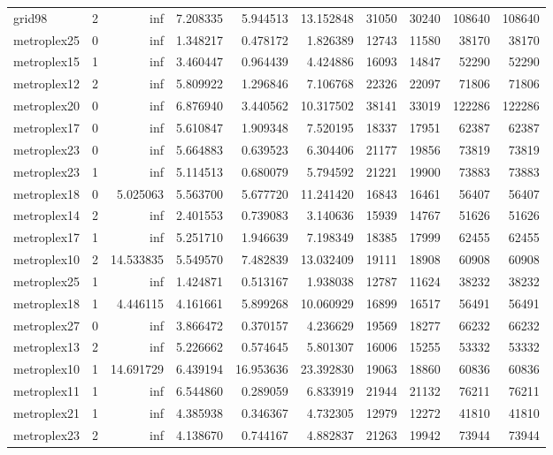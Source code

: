 \begin{longtable}{|l|r|r|r|r|r|r|r|r|r|}
grid98 & 2 & inf & 7.208335 & 5.944513 & 13.152848 & 31050 & 30240 & 108640 & 108640 \\
metroplex25 & 0 & inf & 1.348217 & 0.478172 & 1.826389 & 12743 & 11580 & 38170 & 38170 \\
metroplex15 & 1 & inf & 3.460447 & 0.964439 & 4.424886 & 16093 & 14847 & 52290 & 52290 \\
metroplex12 & 2 & inf & 5.809922 & 1.296846 & 7.106768 & 22326 & 22097 & 71806 & 71806 \\
metroplex20 & 0 & inf & 6.876940 & 3.440562 & 10.317502 & 38141 & 33019 & 122286 & 122286 \\
metroplex17 & 0 & inf & 5.610847 & 1.909348 & 7.520195 & 18337 & 17951 & 62387 & 62387 \\
metroplex23 & 0 & inf & 5.664883 & 0.639523 & 6.304406 & 21177 & 19856 & 73819 & 73819 \\
metroplex23 & 1 & inf & 5.114513 & 0.680079 & 5.794592 & 21221 & 19900 & 73883 & 73883 \\
metroplex18 & 0 & 5.025063 & 5.563700 & 5.677720 & 11.241420 & 16843 & 16461 & 56407 & 56407 \\
metroplex14 & 2 & inf & 2.401553 & 0.739083 & 3.140636 & 15939 & 14767 & 51626 & 51626 \\
metroplex17 & 1 & inf & 5.251710 & 1.946639 & 7.198349 & 18385 & 17999 & 62455 & 62455 \\
metroplex10 & 2 & 14.533835 & 5.549570 & 7.482839 & 13.032409 & 19111 & 18908 & 60908 & 60908 \\
metroplex25 & 1 & inf & 1.424871 & 0.513167 & 1.938038 & 12787 & 11624 & 38232 & 38232 \\
metroplex18 & 1 & 4.446115 & 4.161661 & 5.899268 & 10.060929 & 16899 & 16517 & 56491 & 56491 \\
metroplex27 & 0 & inf & 3.866472 & 0.370157 & 4.236629 & 19569 & 18277 & 66232 & 66232 \\
metroplex13 & 2 & inf & 5.226662 & 0.574645 & 5.801307 & 16006 & 15255 & 53332 & 53332 \\
metroplex10 & 1 & 14.691729 & 6.439194 & 16.953636 & 23.392830 & 19063 & 18860 & 60836 & 60836 \\
metroplex11 & 1 & inf & 6.544860 & 0.289059 & 6.833919 & 21944 & 21132 & 76211 & 76211 \\
metroplex21 & 1 & inf & 4.385938 & 0.346367 & 4.732305 & 12979 & 12272 & 41810 & 41810 \\
metroplex23 & 2 & inf & 4.138670 & 0.744167 & 4.882837 & 21263 & 19942 & 73944 & 73944 \\

\end{longtable}
